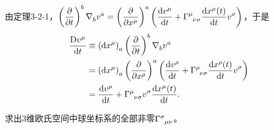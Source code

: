 \begin{xiti}
	\begin{zm}
		由定理3-2-1，$\displaystyle \tensor{\left(\pdv{t}\right)}{^b} \Nabla{b} \tensor{v}{^a} = \tensor{\left(\pdv{x^\mu}\right)}{^a} \left( \dv{\tensor{v}{^\mu}}{t} + \ChristoffelSymbol{\mu}{\nu}{\sigma} \dv{x^\mu(t)}{t} \tensor{v}{^\sigma} \right) $，于是
		\begin{align*}
		\frac{\mathrm{D}\tensor{v}{^\mu}}{\dd{t}} &\equiv \tensor{\left(\dd{x^\mu}\right)}{_a} \tensor{\left(\pdv{t}\right)}{^b} \Nabla{b} \tensor{v}{^a}\\
		&=\tensor{\left(\dd{x^\mu}\right)}{_a} \tensor{\left(\pdv{x^\rho}\right)}{^a} \left( \dv{\tensor{v}{^\rho}}{t} + \ChristoffelSymbol{\rho}{\nu}{\sigma} \dv{x^\rho(t)}{t} \tensor{v}{^\sigma} \right)\\
		&= \dv{\tensor{v}{^\mu}}{t} + \ChristoffelSymbol{\mu}{\nu}{\sigma} \tensor{v}{^\sigma} \dv{x^\mu(t)}{t}  .
		\end{align*}
	\end{zm}
	
	\item \hypertarget{3.7}{}求出3维欧氏空间中球坐标系的全部非零$\ChristoffelSymbol{\sigma}{\mu}{\nu} $。
	

\end{xiti}
